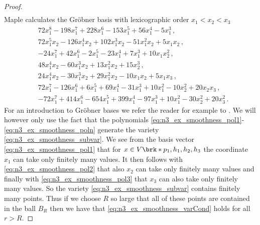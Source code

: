 \begin{proof}
\begin{align}
  \end{align}
  Maple calculates the Gröbner basis with lexicographic order $x_1<x_2<x_3$
  \begin{align}
    & 72x_1^8 - 198x_1^7 + 228x_1^6 - 153x_1^5 + 56x_1^4 - 5x_1^3\,,\label{eq:n3_ex_smoothness_pol1} \\
    & 72x_1^5x_2 - 126x_1^4x_2 + 102x_1^3x_2 - 51x_1^2x_2 + 5x_1x_2\,, \label{eq:n3_ex_smoothness_pol2}\\
    & -24x_1^7 + 42x_1^6 - 2x_1^5 - 23x_1^4 + 7x_1^3 + 10x_1x_2^2\,, \label{eq:n3_ex_smoothness_pol3} \\
    & 48x_1^4x_2 - 60x_1^3x_2 + 13x_1^2x_2 + 15x_2^3\,, \\
    & 24x_1^4x_2 - 30x_1^3x_2 + 29x_1^2x_2 - 10x_1x_2 + 5x_1x_3\,, \\
    & 72x_1^7 - 126x_1^6 + 6x_1^5 + 69x_1^4 - 31x_1^3 + 10x_1^2 - 10x_2^2 + 20x_2x_3\,, \\
    & -72x_1^7 + 414x_1^6 - 654x_1^5 + 399x_1^4 - 97x_1^3 + 10x_1^2 - 30x_2^2 + 20x_3^2\,.\label{eq:n3_ex_smoothness_poln}
  \end{align}
  For an introduction to Gröbner bases we refer the reader for example to \cite{Cox2015}.
  We will however only use the fact that the polynomials \eqref{eq:n3_ex_smoothness_pol1}-\eqref{eq:n3_ex_smoothness_poln}
  generate the variety \eqref{eq:n3_ex_smoothness_subvar}.
  We see from the basis vector \eqref{eq:n3_ex_smoothness_pol1} that
  for $x\in V\brk*{p_1,h_1,h_2,h_3}$ the coordinate $x_1$ can take only finitely many values.
  It then follows with \eqref{eq:n3_ex_smoothness_pol2} that also $x_2$ can take only finitely many values
  and finally with \eqref{eq:n3_ex_smoothness_pol3} that $x_3$ can also take only finitely many values.
  So the variety \eqref{eq:n3_ex_smoothness_subvar} contains finitely many points.
  Thus if we choose $R$ so large that all of these points are contained in the ball $B_R$ then we have
  that \eqref{eq:n3_ex_smoothness_varCond} holds for all $r>R$.
\end{proof}
